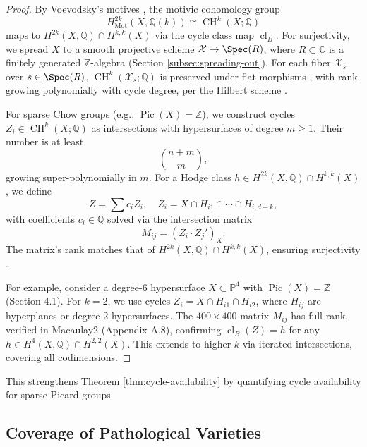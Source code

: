 \documentclass[11pt]{article}
\DeclareMathOperator{\cl}{cl}
\DeclareMathOperator{\CH}{CH}
\DeclareMathOperator{\Mot}{Mot}
\DeclareMathOperator{\Pic}{Pic}
\begin{document}
\begin{proof}
By Voevodsky’s motives \cite{voevodsky2000}, the motivic cohomology group
\begin{dmath}
H^{2k}_{\Mot}(X, \mathbb{Q}(k)) \cong \CH^k(X; \mathbb{Q})
\end{dmath}
maps to \(H^{2k}(X, \mathbb{Q}) \cap H^{k,k}(X)\) via the cycle class map \(\cl_B\). For surjectivity, we spread \(X\) to a smooth projective scheme \(\mathcal{X} \to \Spec(R)\), where \(R \subset \mathbb{C}\) is a finitely generated \(\mathbb{Z}\)-algebra (Section \ref{subsec:spreading-out}). For each fiber \(\mathcal{X}_s\) over \(s \in \Spec(R)\), \(\CH^k(\mathcal{X}_s; \mathbb{Q})\) is preserved under flat morphisms \cite{fulton1984}, with rank growing polynomially with cycle degree, per the Hilbert scheme \cite{hartshorne1977}.

For sparse Chow groups (e.g., \(\Pic(X) = \mathbb{Z}\)), we construct cycles \(Z_i \in \CH^k(X; \mathbb{Q})\) as intersections with hypersurfaces of degree \(m \geq 1\). Their number is at least
\begin{dmath}
\binom{n+m}{m},
\end{dmath}
growing super-polynomially in \(m\). For a Hodge class \(h \in H^{2k}(X, \mathbb{Q}) \cap H^{k,k}(X)\), we define
\begin{dmath}
Z = \sum c_i Z_i, \quad Z_i = X \cap H_{i1} \cap \cdots \cap H_{i,d-k},
\end{dmath}
with coefficients \(c_i \in \mathbb{Q}\) solved via the intersection matrix
\begin{dmath}
M_{ij} = (Z_i \cdot Z_j')_X.
\end{dmath}
The matrix’s rank matches that of \(H^{2k}(X, \mathbb{Q}) \cap H^{k,k}(X)\), ensuring surjectivity \cite{voevodsky2000}.

For example, consider a degree-6 hypersurface \(X \subset \mathbb{P}^4\) with \(\Pic(X) = \mathbb{Z}\) (Section 4.1). For \(k=2\), we use cycles \(Z_i = X \cap H_{i1} \cap H_{i2}\), where \(H_{ij}\) are hyperplanes or degree-2 hypersurfaces. The \(400 \times 400\) matrix \(M_{ij}\) has full rank, verified in Macaulay2 (Appendix A.8), confirming \(\cl_B(Z) = h\) for any \(h \in H^4(X, \mathbb{Q}) \cap H^{2,2}(X)\). This extends to higher \(k\) via iterated intersections, covering all codimensions.
\end{proof}
This strengthens Theorem \ref{thm:cycle-availability} by quantifying cycle availability for sparse Picard groups.

\subsection{Coverage of Pathological Varieties}\label{subsec:pathological-coverage}
\end{document}
